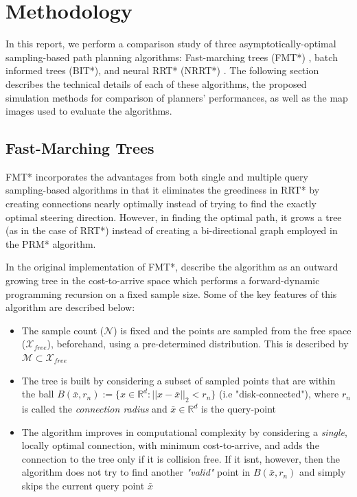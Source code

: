 \documentclass{article}
\begin{document}

\section{Methodology}
\label{sec:Methodology}
In this report, we perform a comparison study of three asymptotically-optimal sampling-based path planning algorithms: Fast-marching trees (FMT*) \cite{FMT}, batch informed trees (BIT*), and neural RRT* (NRRT*) \cite{nrrt}. The following section describes the technical details of each of these algorithms, the proposed simulation methods for comparison of planners' performances, as well as the map images used to evaluate the algorithms.

\subsection{Fast-Marching Trees}
\label{met:fmt}
FMT* incorporates the advantages from both single and multiple query sampling-based algorithms in that it eliminates the greediness in RRT* by creating connections nearly optimally instead of trying to find the exactly optimal steering direction. However, in finding the optimal path, it grows a tree (as in the case of RRT*) instead of creating a bi-directional graph employed in the PRM* algorithm.

In the original implementation of FMT*, \citet{FMT} describe the algorithm as an outward growing tree in the cost-to-arrive space which performs a forward-dynamic programming recursion on a fixed sample size. Some of the key features of this algorithm are described below:
\begin{itemize}
	\item The sample count ($\mathcal{N}$) is fixed and the points are sampled from the free space ($\mathcal{X}_{free}$), beforehand, using a pre-determined distribution. This is described by $\mathcal{M} \subset \mathcal{X}_{free}$
	\item The tree is built by considering a subset of sampled points that are within the ball $B(\bar{x}, r_n) := \{ x \in \mathbb{R}^d: ||x - \bar{x}||_2 < r_n \}$  (i.e "disk-connected"), where $r_n$ is called the \textit{connection radius} and $\bar{x} \in \mathbb{R}^d$ is the query-point
	\item The algorithm improves in computational complexity by considering a \textit{single}, locally optimal connection, with minimum cost-to-arrive, and adds the connection to the tree only if it is collision free. If it isnt, however, then the algorithm does not try to find another \textit{"valid"} point in $B(\bar{x}, r_n)$ and simply skips the current query point $\bar{x}$
\end{itemize}
\end{document}
